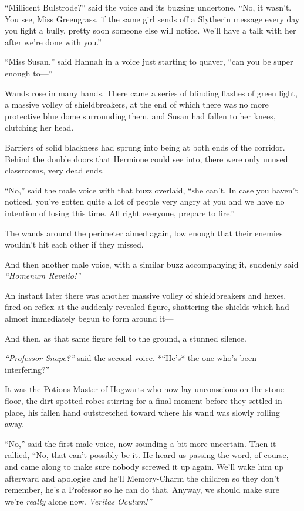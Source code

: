 ``Millicent Bulstrode?'' said the voice and its buzzing undertone. ``No,
it wasn't. You see, Miss Greengrass, if the same girl sends off a
Slytherin message every day you fight a bully, pretty soon someone else
will notice. We'll have a talk with her after we're done with you.''

``Miss Susan,'' said Hannah in a voice just starting to quaver, ``can
you be super enough to---''

Wands rose in many hands. There came a series of blinding flashes of
green light, a massive volley of shieldbreakers, at the end of which
there was no more protective blue dome surrounding them, and Susan had
fallen to her knees, clutching her head.

Barriers of solid blackness had sprung into being at both ends of the
corridor. Behind the double doors that Hermione could see into, there
were only unused classrooms, very dead ends.

``No,'' said the male voice with that buzz overlaid, ``she can't. In
case you haven't noticed, you've gotten quite a lot of people very angry
at you and we have no intention of losing this time. All right everyone,
prepare to fire.''

The wands around the perimeter aimed again, low enough that their
enemies wouldn't hit each other if they missed.

And then another male voice, with a similar buzz accompanying it,
suddenly said \emph{``Homenum Revelio!''}

An instant later there was another massive volley of shieldbreakers and
hexes, fired on reflex at the suddenly revealed figure, shattering the
shields which had almost immediately begun to form around it---

And then, as that same figure fell to the ground, a stunned silence.

\emph{``Professor Snape?''} said the second voice. *``He's* the one
who's been interfering?''

It was the Potions Master of Hogwarts who now lay unconscious on the
stone floor, the dirt-spotted robes stirring for a final moment before
they settled in place, his fallen hand outstretched toward where his
wand was slowly rolling away.

``No,'' said the first male voice, now sounding a bit more uncertain.
Then it rallied, ``No, that can't possibly be it. He heard us passing
the word, of course, and came along to make sure nobody screwed it up
again. We'll wake him up afterward and apologise and he'll Memory-Charm
the children so they don't remember, he's a Professor so he can do that.
Anyway, we should make sure we're \emph{really} alone now. \emph{Veritas
Oculum!''}

